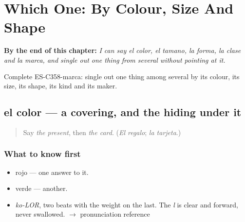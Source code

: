
\chapter{Which One: By Colour, Size And Shape}
\label{ch:el-color-y-el-tamano}

\begin{chapteropening}
\textbf{By the end of this chapter:} \emph{I can say el color, el tamano, la forma, la clase and la marca, and single out one thing from several without pointing at it.}

Complete ES-C358-marca: single out one thing among several by its colour, its size, its shape, its kind and its maker.
\end{chapteropening}

\section[el color]{el color — a covering, and the hiding under it}

\label{lesson:ES-C358-color}



\begin{quote}
Say \emph{the present}, then \emph{the card}. (\emph{El regalo}; \emph{la tarjeta}.)
\end{quote}

\subsection*{What to know first}
\begin{itemize}
\raggedright
  \item rojo — one answer to it.
  \item verde — another.
\end{itemize}

\begin{sounds}
\begin{itemize}
\raggedright
  \item \emph{ko-LOR}, two beats with the weight on the last. The \emph{l} is clear and forward, never swallowed. $\to$ pronunciation reference
\end{itemize}
\end{sounds}

